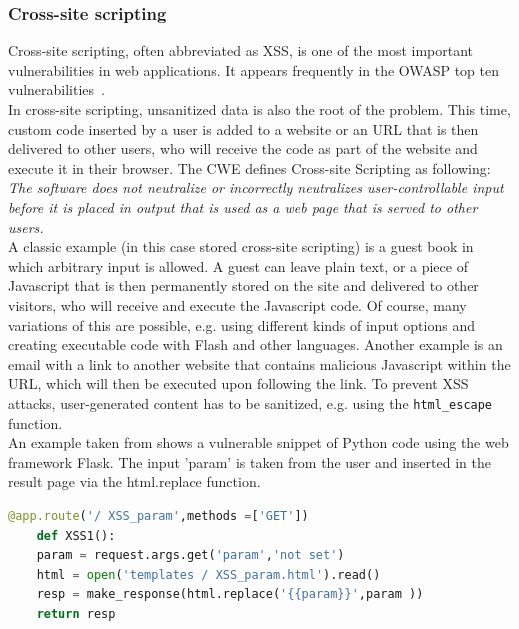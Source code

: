 \documentclass[
a4paper,
pagesize,
pdftex,
12pt,
twoside, %
BCOR=5mm, %
ngerman,
fleqn,
final,
]{scrartcl}
\begin{document}
	\subsubsection{Cross-site scripting}
	Cross-site scripting, often abbreviated as XSS, is one of the most important vulnerabilities in web applications. It appears frequently in the OWASP top ten vulnerabilities~\cite{OWASPFoundation.}.\\
	In cross-site scripting, unsanitized data is also the root of the problem. This time, custom code inserted by a user is added to a website or an URL that is then delivered to other users, who will receive the code as part of the website and execute it in their browser. The CWE defines Cross-site Scripting as following: \textit{The software does not neutralize or incorrectly neutralizes user-controllable input before it is placed in output that is used as a web page that is served to other users.}~\cite{CommonWeaknessEnumeration.19.09.2019}\\
	A classic example (in this case stored cross-site scripting) is a guest book in which arbitrary input is allowed. A guest can leave plain text, or a piece of Javascript that is then permanently stored on the site and delivered to other visitors, who will receive and execute the Javascript code. Of course, many variations of this are possible, e.g. using different kinds of input options and creating executable code with Flash and other languages. Another example is an email with a link to another website that contains malicious Javascript within the URL, which will then be executed upon following the link. 
	To prevent XSS attacks, user-generated content has to be sanitized, e.g. using the \texttt{html\_escape} function.\\
	An example taken from \cite{Micheelsen.2016} shows a vulnerable snippet of Python code using the web framework Flask. The input 'param' is taken from the user and inserted in the result page via the html.replace function.
	\begin{lstlisting}[language=Python, showstringspaces=False]
	@app.route('/ XSS_param',methods =['GET'])
	def XSS1():
	param = request.args.get('param','not set')
	html = open('templates / XSS_param.html').read()
	resp = make_response(html.replace('{{param}}',param ))
	return resp
	\end{lstlisting}
	
	
\end{document}
